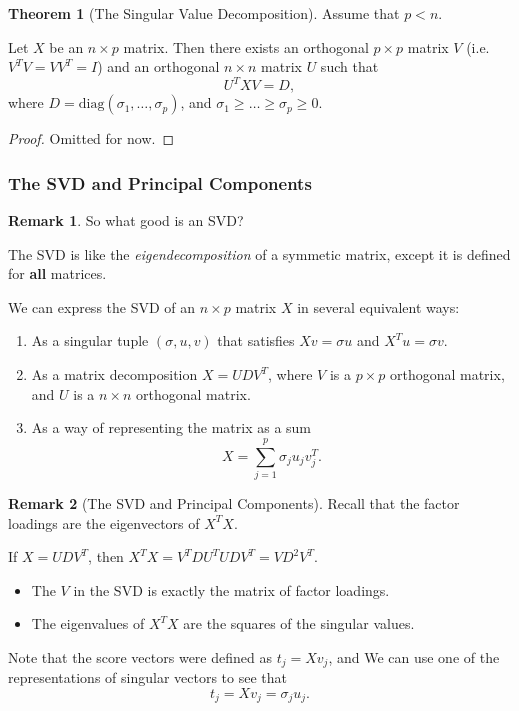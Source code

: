 \documentclass[11pt]{article}
\theoremstyle{definition}
\newtheorem{theorem}{Theorem}[section]
\newtheorem{remark}{Remark}[section]
\numberwithin{equation}{section}
\begin{document}
\begin{theorem}[The Singular Value Decomposition]
  Assume that $p < n$.

  Let $X$ be an $n\times p$ matrix. Then there exists an orthogonal $p\times p$ matrix $V$ (i.e. $V^T V = VV^T = I$) and an orthogonal $n\times n$ matrix $U$ such that
  \begin{equation}
    U^TXV=D,
  \end{equation}
where $D=\text{diag}(\sigma_1,\dots,\sigma_p)$, and $\sigma_1\geq \dots\geq \sigma_p\geq 0$.
\end{theorem}

\begin{proof}
  Omitted for now.
\end{proof}

\subsubsection{The SVD and Principal Components}

\begin{remark}
  So what good is an SVD? 

  The SVD is like the \textit{eigendecomposition} of a symmetic matrix, except it is defined for \textbf{all} matrices.

  We can express the SVD of an $n\times p$ matrix $X$ in several equivalent ways:
  \begin{enumerate}
    \item As a singular tuple $(\sigma,u,v)$ that satisfies $Xv=\sigma u$ and $X^Tu=\sigma v$.
    \item As a matrix decomposition $X=UDV^T$, where $V$ is a $p\times p$ orthogonal matrix, and $U$ is a $n\times n$ orthogonal matrix.
    \item As a way of representing the matrix as a sum
    \begin{equation}
      X=\sum^p_{j=1}\sigma_j u_j v_j^T.
    \end{equation}
  \end{enumerate}
\end{remark}

\begin{remark}[The SVD and Principal Components]
 Recall that the factor loadings are the eigenvectors of $X^TX$.

 If $X=UDV^T$, then $X^TX=V^TDU^TUDV^T=VD^2V^T$.
 \begin{itemize}
 \item The $V$ in the SVD is exactly the matrix of factor loadings.
 \item The eigenvalues of $X^TX$ are the squares of the singular values.
 \end{itemize}
 Note that the score vectors were defined as $t_j=Xv_j$, and We can use one of the representations of singular vectors to see that
 \begin{equation}
   t_j=Xv_j=\sigma_j u_j.
 \end{equation}
\end{remark}
\end{document}
